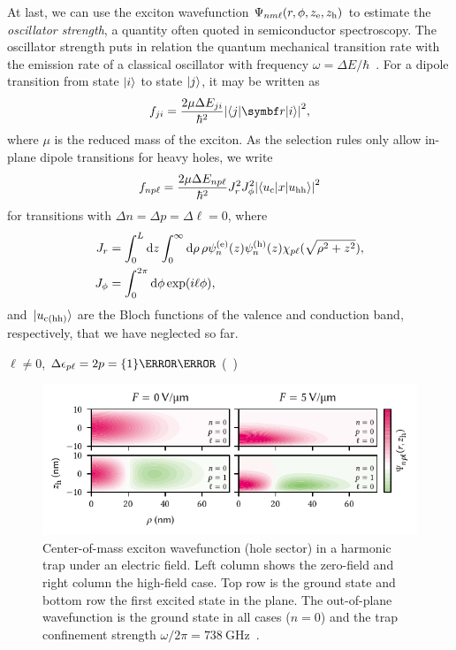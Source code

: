 At last, we can use the exciton wavefunction $\Psi_{nm\ell}(r, \phi, z_{\mathrm{e}}, z_{\mathrm{h}})$ to estimate the \emph{oscillator strength}, a quantity often quoted in semiconductor spectroscopy.
The oscillator strength puts in relation the quantum mechanical transition rate with the emission rate of a classical oscillator with frequency $\omega = \Delta E/\hbar$~\cite{Hilborn1982}.
For a dipole transition from state $\ket{i}$ to state $\ket{j}$, it may be written as~\cite{Davies2009}
\begin{equation}\label{eq:exp:oscillator_strength}
    f_{ji} = \frac{2\mu\Delta E_{ji}}{\hbar^2} \abs{\!\matrixelement{j}{\bvec{r}}{i}}^2,
\end{equation}
where $\mu$ is the reduced mass of the exciton.
As the selection rules only allow in-plane dipole transitions for heavy holes, we write~\cite{Kavokin1994}
\begin{equation}
    f_{np\ell} = \frac{2\mu\Delta E_{np\ell}}{\hbar^2} J_{r}^2 J_{\phi}^2 \abs{\!\matrixelement*{u_{\mr{c}}}{x}{u_{\mr{hh}}}}^2
\end{equation}
for transitions with $\Delta n = \Delta p = \Delta\ell = 0$, where
\begin{align}
    J_{r} &= \int_{0}^{L}\dd{z}\int_0^{\infty}\dd{\rho}\rho\psi_n^{(\mathrm{e})}(z)\psi_n^{(\mathrm{h})}(z)\chi_{p\ell}(\sqrt{\rho^2 + z^2}), \\
    J_{\phi} &= \int_0^{2\pi}\dd{\phi}\exp(i\ell\phi),
\end{align}
and $\ket*{u_{\mathrm{c}(\mathrm{hh})}}$ are the Bloch functions of the valence and conduction band, respectively, that we have neglected so far.

$\ell\neq 0$, $\Delta\eps_{p\ell} = 2p = \qty{1}{\milli\electronvolt}$ (\cf~)


\begin{figure}
    \centering
    \includegraphics{img/pdf/experiment/wavefunction}
    \caption[]{
        Center-of-mass exciton wavefunction (hole sector) in a harmonic trap under an electric field.
        Left column shows the zero-field and right column the high-field case.
        Top row is the ground state and bottom row the first excited state in the plane.
        The out-of-plane wavefunction is the ground state in all cases ($n=0$) and the trap confinement strength $\omega/2\pi = \qty{738}{\giga\hertz}$~\cite[Sec.~2.2.2]{Descamps2021}.
    }
    \label{fig:exp:theory:qcse:wf}
\end{figure}


